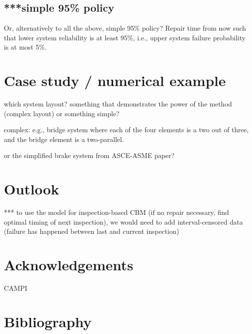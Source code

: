 \documentclass[authoryear]{elsarticle}
\begin{document}
\subsection{***simple 95\% policy}

Or, alternatively to all the above, simple 95\% policy?
Repair time from now such that lower system reliability is at least 95\%, i.e., upper system failure probability is at most 5\%.


\section{Case study / numerical example}

which system layout? something that demonstrates the power of the method (complex layout) or something simple?

complex: e.g., bridge system where each of the four elements is a two out of three, and the bridge element is a two-parallel.

or the simplified brake system from ASCE-ASME paper?


\section{Outlook}

*** to use the model for inspection-based CBM (if no repair necessary, find optimal timing of next inspection),
we would need to add interval-censored data (failure has happened between last and current inspection)



\section*{Acknowledgements}

CAMPI


\section*{Bibliography}




\end{document}
